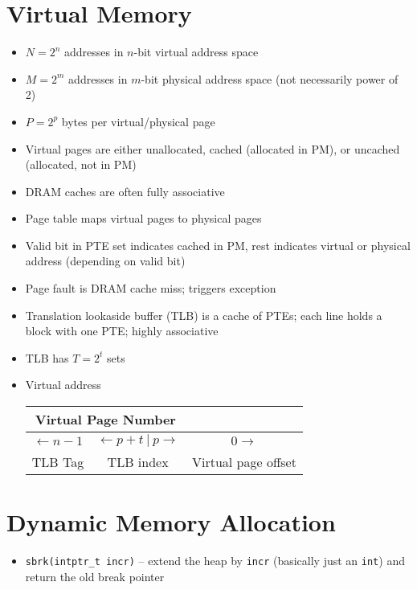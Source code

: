 \documentclass[twocolumn]{article}
\renewcommand{\tt}[1]{\texttt{#1}}
\begin{document}
\section{Virtual Memory}
\begin{itemize}[noitemsep]
\item $N = 2^n$ addresses in $n$-bit virtual address space
\item $M = 2^m$ addresses in $m$-bit physical address space (not necessarily power of 2)
\item $P = 2^p$ bytes per virtual/physical page
\item Virtual pages are either unallocated, cached (allocated in PM), or uncached (allocated, not in PM)
\item DRAM caches are often fully associative
\item Page table maps virtual pages to physical pages
\item Valid bit in PTE set indicates cached in PM, rest indicates virtual or physical address (depending on valid bit)
\item Page fault is DRAM cache miss; triggers exception
\item Translation lookaside buffer (TLB) is a cache of PTEs; each line holds a block with one PTE; highly associative
\item TLB has $T = 2^t$ sets
\item Virtual address \\

\begin{tabular}{| c | c | c |}
    \multicolumn{2}{|c|}{Virtual Page Number} & \\ \hline
    $\leftarrow n - 1$ & $\leftarrow p + t \ |\ p \rightarrow$ & $0 \rightarrow$ \\ \hline
    TLB Tag & TLB index & Virtual page offset
\end{tabular}
\end{itemize}

\section{Dynamic Memory Allocation}
\begin{itemize}[noitemsep]
\item \tt{sbrk(intptr\_t incr)} -- extend the heap by \tt{incr} (basically just an \tt{int}) and return the old break pointer
\end{itemize}

\vfill
\end{document}
